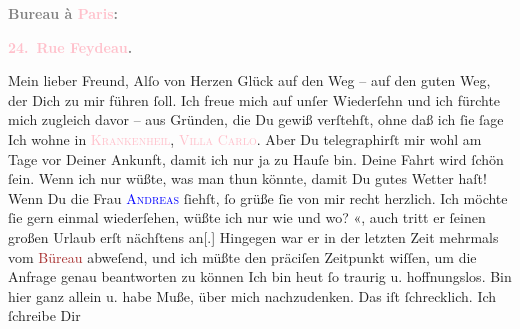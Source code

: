            \pstart
           \begin{otherlanguage}{french}\textcolor{gray}{\textbf{\textbf{Bureau à \textcolor{pink}{Paris}{}\ledrightnote{\textcolor{pink}{Paris}}:}}}\end{otherlanguage}\pend
           \pstart
           \begin{otherlanguage}{french}\textcolor{gray}{\textbf{\textbf{\textcolor{pink}{24. Rue Feydeau}{}\ledrightnote{\textcolor{pink}{rue Feydeau}}.}}}\end{otherlanguage}\pend
           \pstart\center{}Mein lieber Freund,\pend\pstart
           Alſo von Herzen Glück auf den Weg – auf den guten Weg, der Dich zu mir führen ſoll.
               Ich freue mich auf unſer Wiederſehn und ich fürchte mich zugleich davor – aus
               Gründen, die Du gewiß verſtehſt, ohne daß ich ſie ſage{\dotsfive}\pend
           \pstart
           Ich wohne in \textsc{\textcolor{pink}{Krankenheil}{}\ledrightnote{\textcolor{pink}{Bad Krankenheil}}}, \textsc{\textcolor{pink}{Villa Carlo}{}\ledrightnote{\textcolor{pink}{Villa Carlo}}}. Aber Du telegraphirſt mir wohl am Tage vor Deiner Ankunft, {\pb}damit ich nur ja zu Hauſe bin.\pend
           \pstart
           Deine Fahrt wird ſchön ſein. Wenn ich nur wüßte, was man thun könnte, damit Du gutes
               Wetter haſt!\pend
           \pstart
           Wenn Du die Frau \textsc{\textcolor{blue}{Andreas}{}\ledrightnote{\textcolor{blue}{Lou Andreas-Salomé}}} ſiehſt, ſo grüße ſie von mir recht herzlich. Ich möchte ſie gern einmal
               wiederſehen, wüßte ich nur wie und wo?\pend
           \pstart
           \label{K_L02745-44v}\label{K_L02745-44h}«, auch tritt er ſeinen großen Urlaub
               erſt nächſtens an{[}.{]}{ }{\pb}Hingegen war er in der letzten Zeit mehrmals vom
                  \textcolor{brown}{Büreau}{} abweſend, und ich
               müßte den präciſen Zeitpunkt wiſſen, um die Anfrage  genau beantworten zu können{\dotssix}\pend
           \pstart
           Ich bin heut ſo traurig u. hoffnungslos. Bin hier ganz
               allein u. habe Muße, über mich nachzudenken. Das iſt ſchrecklich. Ich ſchreibe Dir
